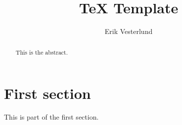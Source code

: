 \documentclass{article}
\title{TeX Template}
\author{Erik Vesterlund} %
\begin{document}
\maketitle

\newpage

\tableofcontents

\newpage

\begin{abstract}
This is the abstract.
\end{abstract}

\newpage

\section{First section}

This is part of the first section.
\newline

\end{document}
